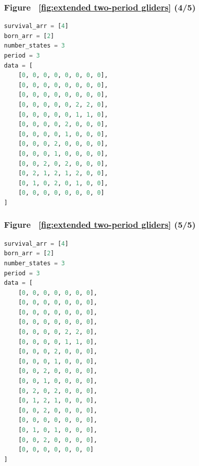 \documentclass[12pt]{article}
\numberwithin{figure}{section} %
\begin{document}
\noindent\begin{minipage}{.5\textwidth}
\subsubsection{Figure ~\ref{fig:extended two-period gliders} (4/5)}
\label{subsubsection:extended two-period gliders(4/5)}
\begin{lstlisting}[language = Python]
survival_arr = [4]
born_arr = [2]
number_states = 3
period = 3 
data = [
    [0, 0, 0, 0, 0, 0, 0, 0],
    [0, 0, 0, 0, 0, 0, 0, 0],
    [0, 0, 0, 0, 0, 0, 0, 0],
    [0, 0, 0, 0, 0, 2, 2, 0],
    [0, 0, 0, 0, 0, 1, 1, 0],
    [0, 0, 0, 0, 2, 0, 0, 0],
    [0, 0, 0, 0, 1, 0, 0, 0],
    [0, 0, 0, 2, 0, 0, 0, 0],
    [0, 0, 0, 1, 0, 0, 0, 0],
    [0, 0, 2, 0, 2, 0, 0, 0],
    [0, 2, 1, 2, 1, 2, 0, 0],
    [0, 1, 0, 2, 0, 1, 0, 0],
    [0, 0, 0, 0, 0, 0, 0, 0]
]

\end{lstlisting}
\end{minipage}\hfill
\begin{minipage}{.45\textwidth}
\subsubsection{Figure ~\ref{fig:extended two-period gliders} (5/5)}
\label{subsubsection:extended two-period gliders(5/5)}
\begin{lstlisting}[language = Python]
survival_arr = [4]
born_arr = [2]
number_states = 3
period = 3
data = [
    [0, 0, 0, 0, 0, 0, 0],
    [0, 0, 0, 0, 0, 0, 0],
    [0, 0, 0, 0, 0, 0, 0],
    [0, 0, 0, 0, 0, 0, 0],
    [0, 0, 0, 0, 2, 2, 0],
    [0, 0, 0, 0, 1, 1, 0],
    [0, 0, 0, 2, 0, 0, 0],
    [0, 0, 0, 1, 0, 0, 0],
    [0, 0, 2, 0, 0, 0, 0],
    [0, 0, 1, 0, 0, 0, 0],
    [0, 2, 0, 2, 0, 0, 0],
    [0, 1, 2, 1, 0, 0, 0],
    [0, 0, 2, 0, 0, 0, 0],
    [0, 0, 0, 0, 0, 0, 0],
    [0, 1, 0, 1, 0, 0, 0],
    [0, 0, 2, 0, 0, 0, 0],
    [0, 0, 0, 0, 0, 0, 0]
]
\end{lstlisting}
\end{minipage}
\end{document}
